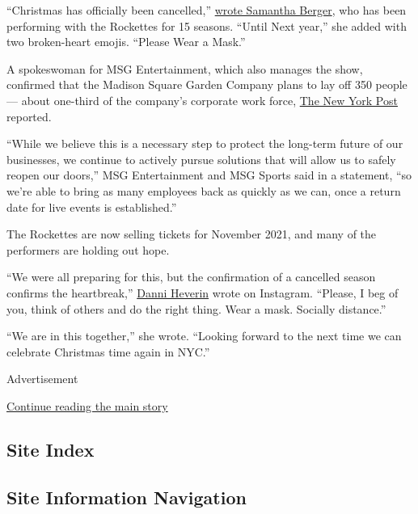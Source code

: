 ``Christmas has officially been cancelled,''
\href{https://www.instagram.com/p/CDeIBq_j0f0/?igshid=ejai6nxe4mff}{wrote
Samantha Berger}, who has been performing with the Rockettes for 15
seasons. ``Until Next year,'' she added with two broken-heart emojis.
``Please Wear a Mask.''

A spokeswoman for MSG Entertainment, which also manages the show,
confirmed that the Madison Square Garden Company plans to lay off 350
people --- about one-third of the company's corporate work force,
\href{https://nypost.com/2020/08/04/radio-city-christmas-spectacular-canceled-for-first-time-ever/?utm_source=browser\&utm_medium=push-notification\&utm_campaign=radio-city-christmas-spectacular-canceled-for-first-time-ever}{The
New York Post} reported.

``While we believe this is a necessary step to protect the long-term
future of our businesses, we continue to actively pursue solutions that
will allow us to safely reopen our doors,'' MSG Entertainment and MSG
Sports said in a statement, ``so we're able to bring as many employees
back as quickly as we can, once a return date for live events is
established.''

The Rockettes are now selling tickets for November 2021, and many of the
performers are holding out hope.

``We were all preparing for this, but the confirmation of a cancelled
season confirms the heartbreak,''
\href{https://www.instagram.com/p/CDeFKMNhVPe/?igshid=v8q5sop9v4qz}{Danni
Heverin} wrote on Instagram. ``Please, I beg of you, think of others and
do the right thing. Wear a mask. Socially distance.''

``We are in this together,'' she wrote. ``Looking forward to the next
time we can celebrate Christmas time again in NYC.''

Advertisement

\protect\hyperlink{after-bottom}{Continue reading the main story}

\hypertarget{site-index}{%
\subsection{Site Index}\label{site-index}}

\hypertarget{site-information-navigation}{%
\subsection{Site Information
Navigation}\label{site-information-navigation}}

